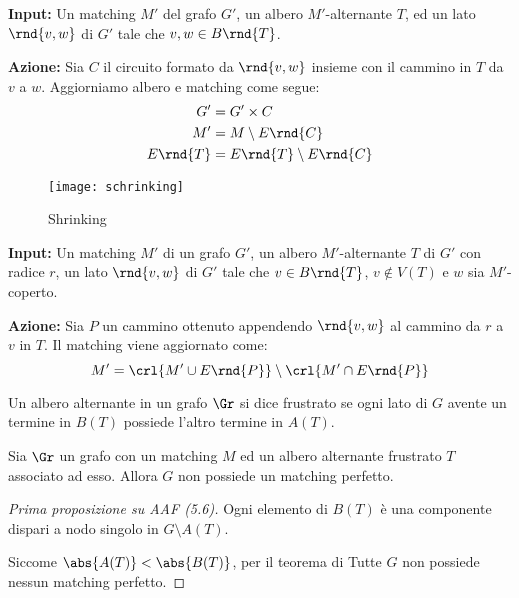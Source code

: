 \documentclass[\main/main.tex]{subfiles}
\begin{document}
\begin{definition}
	\textbf{Input:} Un matching \(M'\) del grafo \(G'\), un albero \(M'\)-alternante \(T\), ed un lato \(\rnd{v, w}\) di \(G'\) tale che \(v, w \in B\rnd{T}\).

	\textbf{Azione:} Sia \(C\) il circuito formato da \(\rnd{v, w}\) insieme con il cammino in \(T\) da \(v\) a \(w\). Aggiorniamo albero e matching come segue:
	\begin{align*}
		G'       & = G' \times C                 \\
		M'       & = M\setminus E\rnd{C}         \\
		E\rnd{T} & = E\rnd{T} \setminus E\rnd{C}
	\end{align*}
	\begin{figure}
		\texttt{[image: schrinking]}
		\caption{Shrinking}
	\end{figure}
\end{definition}
\clearpage
\begin{definition}
	\textbf{Input:} Un matching \(M'\) di un grafo \(G'\), un albero \(M'\)-alternante \(T\) di \(G'\) con radice \(r\), un lato \(\rnd{v, w}\) di \(G'\) tale che \(v \in B\rnd{T}\), \(v \not\in V(T)\) e \(w\) sia \(M'\)-coperto.

	\textbf{Azione:} Sia \(P\) un cammino ottenuto appendendo \(\rnd{v, w}\) al cammino da \(r\) a \(v\) in \(T\). Il matching viene aggiornato come:
	\[
		M' = \crl{M'\cup E\rnd{P}}\setminus\crl{M' \cap E\rnd{P}}
	\]
\end{definition}
\begin{definition}
	Un albero alternante in un grafo \(\Gr \) si dice frustrato se ogni lato di \(G\) avente un termine in \(B(T)\) possiede l'altro termine in \(A(T)\).
\end{definition}
\begin{proposition}
	Sia \(\Gr \) un grafo con un matching \(M\) ed un albero alternante frustrato \(T\) associato ad esso. Allora \(G\) non possiede un matching perfetto.
\end{proposition}
\begin{proof}[Prima proposizione su AAF (5.6)]
	Ogni elemento di \(B(T)\) è una componente dispari a nodo singolo in \(G \setminus A(T)\).

	Siccome \(\abs{A(T)} < \abs{B(T)}\), per il teorema di Tutte \(G\) non possiede nessun matching perfetto.
\end{proof}
\end{document}
